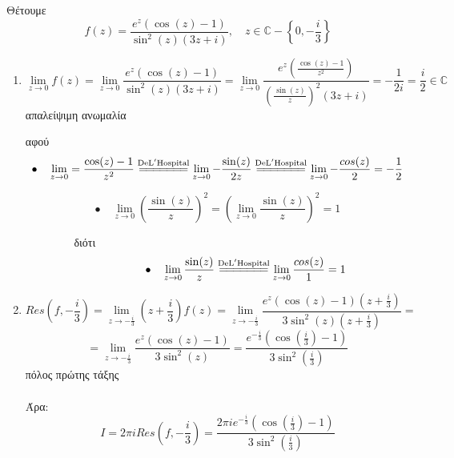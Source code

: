 \documentclass[12pt]{article}
\begin{document}
\\ \\
Θέτουμε $$f(z)=\frac{ e^z(\cos(z)-1)}{\sin^2(z)(3z+i)},\quad z\in\mathbb{C}-\left\{0,-\frac{i}{3} \right\} $$


\begin{enumerate}

\item
$$ \lim_{z\to 0}f(z)=\lim_{z\to 0}\frac{ e^z(\cos(z)-1)}{\sin^2(z)(3z+i)}=\lim_{z\to 0}\frac{ e^z\left(\frac{\cos(z)-1}{z^2}\right)}{\left(\frac{\sin(z)}{z}\right)^2(3z+i)}=- \frac{1}{2i}= \frac{i}{2}\in\mathbb{C} \quad $$ απαλείψιμη ανωμαλία

αφού
$$ \bullet \quad \lim_{z\to 0}=\frac{\cos(z)-1}{z^2}\overset{\mathrm{De L'Hospital}}{=\joinrel=\joinrel=\joinrel=\joinrel=\joinrel=\joinrel=}
\lim_{z\to 0}-\frac{\sin(z)}{2z}\overset{\mathrm{De L'Hospital}}{=\joinrel=\joinrel=\joinrel=\joinrel=\joinrel=\joinrel=}\lim_{z\to 0}-\frac{cos(z)}{2}=-\frac{1}{2}$$

$$ \bullet \quad \lim_{z\to 0}\left(\frac{\sin(z)}{z}\right)^2=\left(\lim_{z\to 0}\frac{\sin(z)}{z}\right)^2=1 $$

$ \qquad \qquad$ διότι
$$ \qquad \qquad \quad \bullet \quad \lim_{z\to 0}\frac{\sin(z)}{z}\overset{\mathrm{De L'Hospital}}{=\joinrel=\joinrel=\joinrel=\joinrel=\joinrel=\joinrel=}\lim_{z\to 0}\frac{cos(z)}{1}=1 $$

\item
$$ Res\left(f,-\frac{i}{3}\right)= \lim_{z\to -\frac{i}{3}}\left(z+\frac{i}{3}\right)f(z)=\lim_{z\to -\frac{i}{3}}\frac{ e^z(\cos(z)-1)\left(z+\frac{i}{3}\right)}{3\sin^2(z)\left(z+\frac{i}{3}\right)}= $$
$$=\lim_{z\to -\frac{i}{3}}\frac{ e^z(\cos(z)-1)}{3\sin^2(z)}=\frac{ e^{-\frac{i}{3}}\left(\cos\left(\frac{i}{3}\right)-1\right)}{3\sin^2\left(\frac{i}{3}\right)}  $$ πόλος πρώτης τάξης
\\ \\
Άρα:
$$ I=2\pi i Res\left(f,-\frac{i}{3}\right)=\frac{ 2 \pi i e^{-\frac{i}{3}}\left(\cos\left(\frac{i}{3}\right)-1\right)}{3\sin^2\left(\frac{i}{3}\right)} $$
\end{enumerate}
\end{document}

